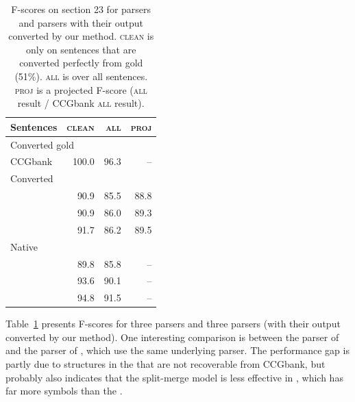 \begin{table}
\renewcommand{\tabcolsep}{1.8mm}
\small
\begin{center}
\begin{tabular}{lrr|r}
	\hline
	Sentences & \textsc{clean} & \textsc{all} & \textsc{proj} \\
	\hline
	\hline
		\multicolumn{2}{l}{Converted gold \ccg} & & \\
		CCGbank & \hspace{0mm}100.0 & \hspace{0mm}96.3 & -- \\
	\hline
		\multicolumn{2}{l}{Converted \ccg} & & \\
		\textcite{Clark-Curran:2007} & 90.9 & 85.5 & 88.8 \\
		\textcite{Fowler-Penn:2010} & 90.9 & 86.0 & 89.3 \\
		\textcite{Auli-Lopez:2011} & 91.7 & 86.2 & 89.5 \\
	\hline
		\multicolumn{2}{l}{Native \ptb} & & \\
		\textcite{Klein-Manning:2003} & 89.8 & 85.8 & -- \\
		\textcite{Petrov-Klein:2007} & 93.6 & 90.1 & -- \\
		\textcite{Charniak-Johnson:2005} & 94.8 & 91.5 & -- \\
	\hline
\end{tabular}
\caption{
	\label{tab:full-comp}
	F-scores on section 23 for \ptb parsers and \ccg parsers with their output
	converted by our method.
	\textsc{clean} is only on sentences that are converted perfectly from gold
	\ccg (51\%).
	\textsc{all} is over all sentences.  
	\textsc{proj} is a projected F-score (\textsc{all} result / CCGbank
	\textsc{all} result).
}
\end{center}
\end{table}

Table~\ref{tab:full-comp} presents F-scores for three \ptb parsers and three
\ccg parsers (with their output converted by our method).  One interesting
comparison is between the \ptb parser of \textcite{Petrov-Klein:2007} and the
\ccg parser of \textcite{Fowler-Penn:2010}, which use the same underlying
parser.  The performance gap is partly due to structures in the \ptb that are
not recoverable from CCGbank, but probably also indicates that the split-merge
model is less effective in \ccg, which has far more symbols than the \ptb.

